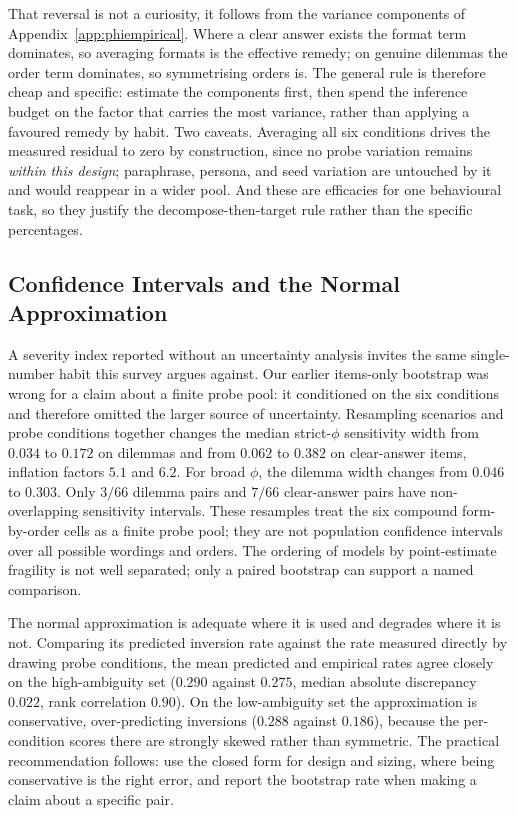 \documentclass[11pt]{article}
\begin{document}
That reversal is not a curiosity, it follows from the variance components of
Appendix~\ref{app:phiempirical}. Where a clear answer exists the format
term dominates, so averaging formats is the effective remedy; on genuine
dilemmas the order term dominates, so symmetrising orders is. The general rule
is therefore cheap and specific: estimate the components first, then spend the
inference budget on the factor that carries the most variance, rather than
applying a favoured remedy by habit. Two caveats. Averaging all six conditions
drives the measured residual to zero by construction, since no probe variation
remains \emph{within this design}; paraphrase, persona, and seed variation are
untouched by it and would reappear in a wider pool. And these are efficacies for
one behavioural task, so they justify the decompose-then-target rule rather than
the specific percentages.

\subsection{Confidence Intervals and the Normal Approximation}
\label{app:phici}

A severity index reported without an uncertainty analysis invites the same single-number
habit this survey argues against. Our earlier items-only bootstrap was wrong for
a claim about a finite probe pool: it conditioned on the six conditions and
therefore omitted the larger source of uncertainty. Resampling scenarios and
probe conditions together changes the median strict-$\phi$ sensitivity width from
$0.034$ to $0.172$ on dilemmas and from $0.062$ to $0.382$ on clear-answer
items, inflation factors $5.1$ and $6.2$. For broad $\phi$, the dilemma width
changes from $0.046$ to $0.303$. Only $3/66$ dilemma pairs and $7/66$
clear-answer pairs have non-overlapping sensitivity intervals. These resamples
treat the six compound form-by-order cells as a finite probe pool; they are not
population confidence intervals over all possible wordings and orders. The ordering of
models by point-estimate fragility is not well separated; only a paired
bootstrap can support a named comparison.

The normal approximation is adequate where it is used and degrades where it is
not. Comparing its predicted inversion rate against the rate measured directly
by drawing probe conditions, the mean predicted and empirical rates agree
closely on the high-ambiguity set ($0.290$ against $0.275$, median absolute
discrepancy $0.022$, rank correlation $0.90$). On the low-ambiguity set the
approximation is conservative, over-predicting inversions ($0.288$ against
$0.186$), because the per-condition scores there are strongly skewed rather than
symmetric. The practical recommendation follows: use the closed form for design
and sizing, where being conservative is the right error, and report the
bootstrap rate when making a claim about a specific pair.
\end{document}
